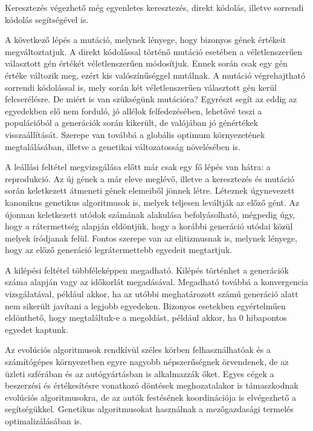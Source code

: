 \documentclass[12pt,a4paper,oneside]{report}
\begin{document}


Keresztezés végezhető még egyenletes keresztezés, direkt kódolás, illetve sorrendi kódolás segítségével is.

A következő lépés a mutáció, melynek lényege, hogy bizonyos gének értékeit megváltoztatjuk. 
A direkt kódolással történő mutáció esetében a véletlenszerűen választott gén értékét véletlenszerűen módosítjuk. 
Ennek során csak egy gén értéke változik meg, ezért kis valószínűséggel mutálnak. 
A mutáció végrehajtható sorrendi kódolással is, mely során két véletlenszerűen választott gén kerül felcserélésre. 
De miért is van szükségünk mutációra? 
Egyrészt segít az eddig az egyedekben elő nem forduló, jó allélok felfedezésében, lehetővé teszi a populációból a generációk során kikerült, de valójában jó génértékek visszaállítását. 
Szerepe van továbbá a globális optimum környezetének megtalálásában, illetve a genetikai változatosság növelésében is.

A leállási feltétel megvizsgálása előtt már csak egy fő lépés van hátra: a reprodukció. 
Az új gének a már eleve meglévő, illetve a keresztezés és mutáció során keletkezett átmeneti gének elemeiből jönnek létre.
Léteznek úgynevezett kanonikus genetikus algoritmusok is, melyek teljesen leváltják az előző gént. 
Az újonnan keletkezett utódok számának alakulása befolyásolható, mégpedig úgy, hogy a rátermettség alapján eldöntjük, hogy a korábbi generáció utódai közül melyek íródjanak felül. 
Fontos szerepe van az elitizmusnak is, melynek lényege, hogy az előző generáció legrátermettebb egyedeit megtartjuk.

A kilépési feltétel többféleképpen megadható. Kilépés történhet a generációk száma alapján vagy az időkorlát megadásával. Megadható továbbá a konvergencia vizsgálatával, például akkor, ha az utóbbi meghatározott számú generáció alatt nem sikerült javítani a legjobb egyedeken. Bizonyos esetekben egyértelműen eldönthető, hogy megtaláltuk-e a megoldást, például akkor, ha 0 hibapontos egyedet kaptunk.

Az evolúciós algoritmusok rendkívül széles körben felhasználhatóak és a számítógépes környezetben egyre nagyobb népszerűségnek örvendenek, de az üzleti szférában és az autógyártásban is alkalmazzák őket. 
Egyes cégek a beszerzési és értékesítésre vonatkozó döntések meghozatalakor is támaszkodnak evolúciós algoritmusokra, de az autók festésének koordinációja is elvégezhető a segítségükkel. 
Genetikus algoritmusokat használnak a mezőgazdasági termelés optimalizálásában is.
\end{document}
